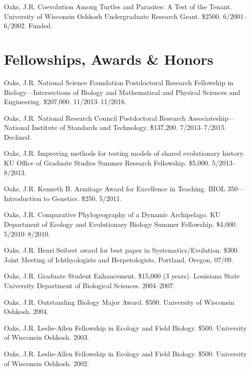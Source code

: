\documentclass[10pt]{article}
\newcommand{\ignore}[1]{}
\newcommand{\myHangIndent}{\hangindent=5mm}
\begin{document}
\myHangIndent
Oaks, J.R.
Coevolution Among Turtles and Parasites: A Test of the Tenant.
University of Wisconsin Oshkosh Undergraduate Research Grant.
\$2500.
6/2001--6/2002.
Funded.

\section*{Fellowships, Awards \& Honors}
\myHangIndent
Oaks, J.R.
National Science Foundation Postdoctoral Research Fellowship in
Biology---Intersections of Biology and Mathematical and Physical Sciences and
Engineering.
\$207,000.
11/2013--11/2016.

\myHangIndent
Oaks, J.R.
National Research Council Postdoctoral Research Associateship---National
Institute of Standards and Technology.
\$137,200.
7/2013--7/2015.
Declined.

\myHangIndent
Oaks, J.R.
Improving methods for testing models of shared evolutionary history.
KU Office of Graduate Studies Summer Research Fellowship.
\$5,000.
5/2013--8/2013.

\myHangIndent
Oaks, J.R.
Kenneth B. Armitage Award for Excellence in Teaching.
BIOL 350---Introduction to Genetics.
\$250.
5/2011.

\ignore{
\myHangIndent
Oaks, J.R.
Comparative Phylogeography of a Dynamic Archipelago.
KU Office of Graduate Studies Summer Research Fellowship.
\$5,000.
5/2010--8/2010.
Not funded.
}

\myHangIndent
Oaks, J.R.
Comparative Phylogeography of a Dynamic Archipelago.
KU Department of Ecology and Evolutionary Biology Summer Fellowship.
\$4,000.
5/2010--8/2010.

\myHangIndent
Oaks, J.R.
Henri Seibert award for best paper in Systematics/Evolution.
\$300.
Joint Meeting of Ichthyologists and Herpetologists, Portland, Oregon, 07/09.

\myHangIndent
Oaks, J.R.
Graduate Student Enhancement.
\$15,000 (3 years).
Louisiana State University Department of Biological Sciences.
2004--2007.

\myHangIndent
Oaks, J.R.
Outstanding Biology Major Award.
\$500.
University of Wisconsin Oshkosh.
2004.

\myHangIndent
Oaks, J.R.
Leslie-Allen Fellowship in Ecology and Field Biology.
\$500.
University of Wisconsin Oshkosh.
2003.

\myHangIndent
Oaks, J.R.
Leslie-Allen Fellowship in Ecology and Field Biology.
\$500.
University of Wisconsin Oshkosh.
2002.
\end{document}
